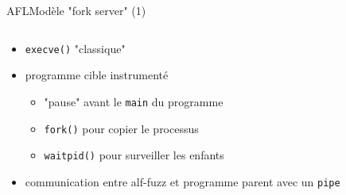\begin{frame}{AFL}{Modèle "fork server" (1)}
\begin{columns}[t]
\begin{column}{0.5\textwidth}
      \begin{itemize}
      \item \lstinline{execve()} "classique"
      \item programme cible instrumenté
        \begin{itemize}
        \item "pause" avant le \lstinline{main} du programme
        \item \lstinline{fork()} pour copier le processus
        \item \lstinline{waitpid()} pour surveiller les enfants
        \end{itemize}
      \item communication entre alf-fuzz et programme parent avec un \lstinline{pipe}
      \end{itemize}
    \end{column}
  \end{columns}
\end{frame}

